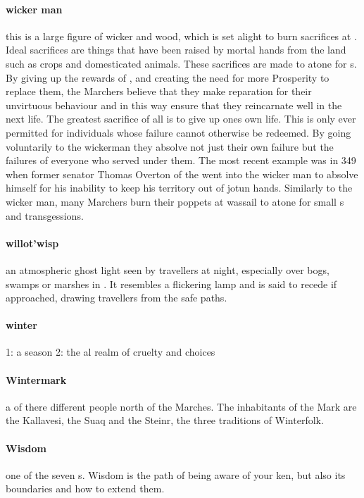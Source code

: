 \paragraph{wicker man} this is a large figure of wicker and wood, which is set alight to burn sacrifices at . Ideal sacrifices are things that have been raised by mortal hands from the land such as crops and domesticated animals. These sacrifices are made to atone for s. By giving up the rewards of , and creating the need for more Prosperity to replace them, the Marchers believe that they make reparation for their unvirtuous behaviour and in this way ensure that they reincarnate well in the next life. The greatest sacrifice of all is to give up ones own life. This is only ever permitted for individuals whose failure cannot otherwise be redeemed. By going voluntarily to the wickerman they absolve not just their own failure but the failures of everyone who served under them. The most recent example was in 349 when former senator Thomas Overton of the  went into the wicker man to absolve himself for his inability to keep his territory out of jotun hands. Similarly to the wicker man, many Marchers burn their poppets at wassail to atone for small s and transgessions. 
\paragraph{willot'wisp} an atmospheric ghost light seen by travellers at night, especially over bogs, swamps or marshes in . It resembles a flickering lamp and is said to recede if approached, drawing travellers from the safe paths.
\paragraph{winter} 1: a season 2: the al realm of cruelty and choices
\paragraph{Wintermark} a  of there different people north of the Marches. The inhabitants of the Mark are the Kallavesi, the Suaq and the Steinr, the three traditions of Winterfolk.
\paragraph{Wisdom} one of the seven s. Wisdom is the path of being aware of your ken, but also its boundaries and how to extend them. 
